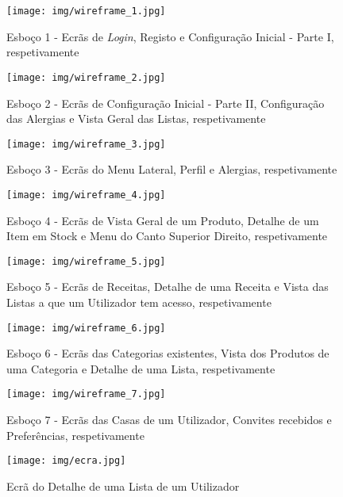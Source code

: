\begin{figure}[H]
	\centering
	\texttt{[image: img/wireframe\_1.jpg]}
	\caption{Esboço 1 - Ecrãs de \textit{Login}, Registo e Configuração Inicial - Parte I, respetivamente}
	\label{wireframe1}
\end{figure}

\begin{figure}[H]
	\centering
	\texttt{[image: img/wireframe\_2.jpg]}
	\caption{Esboço 2 - Ecrãs de Configuração Inicial - Parte II, Configuração das Alergias e Vista Geral das Listas, respetivamente}
	\label{wireframe2}
\end{figure}

\begin{figure}[H]
	\centering
	\texttt{[image: img/wireframe\_3.jpg]}
	\caption{Esboço 3 - Ecrãs do Menu Lateral, Perfil e Alergias, respetivamente}
	\label{wireframe3}
\end{figure}

\begin{figure}[H]
	\centering
	\texttt{[image: img/wireframe\_4.jpg]}
	\caption{Esboço 4 - Ecrãs de Vista Geral de um Produto, Detalhe de um Item em Stock e Menu do Canto Superior Direito, respetivamente}
	\label{wireframe4}
\end{figure}

\begin{figure}[H]
	\centering
	\texttt{[image: img/wireframe\_5.jpg]}
	\caption{Esboço 5 - Ecrãs de Receitas, Detalhe de uma Receita e Vista das Listas a que um Utilizador tem acesso, respetivamente}
	\label{wireframe5}
\end{figure}

\begin{figure}[H]
	\centering
	\texttt{[image: img/wireframe\_6.jpg]}
	\caption{Esboço 6 - Ecrãs das Categorias existentes, Vista dos Produtos de uma Categoria e Detalhe de uma Lista, respetivamente}
	\label{wireframe6}
\end{figure}

\begin{figure}[H]
	\centering
	\texttt{[image: img/wireframe\_7.jpg]}
	\caption{Esboço 7 - Ecrãs das Casas de um Utilizador, Convites recebidos e Preferências, respetivamente}
	\label{wireframe7}
\end{figure}

\begin{figure}[H]
	\centering
	\texttt{[image: img/ecra.jpg]}
	\caption{Ecrã do Detalhe de uma Lista de um Utilizador}
	\label{ecra}
\end{figure}

